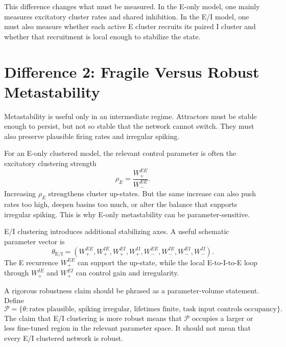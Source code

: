 This difference changes what must be measured. In the E-only model, one mainly measures excitatory cluster rates and shared inhibition. In the E/I model, one must also measure whether each active E cluster recruits its paired I cluster and whether that recruitment is local enough to stabilize the state.

\section{Difference 2: Fragile Versus Robust Metastability}
\label{sec:difference-fragile-versus-robust-metastability}

Metastability is useful only in an intermediate regime. Attractors must be stable enough to persist, but not so stable that the network cannot switch. They must also preserve plausible firing rates and irregular spiking.

For an E-only clustered model, the relevant control parameter is often the excitatory clustering strength
%
\begin{equation}
  \rho_E=\frac{W_+^{EE}}{W_-^{EE}}.
  \label{eq:e-cluster-strength-ratio-ch14}
\end{equation}
%
Increasing $\rho_E$ strengthens cluster up-states. But the same increase can also push rates too high, deepen basins too much, or alter the balance that supports irregular spiking. This is why E-only metastability can be parameter-sensitive.

E/I clustering introduces additional stabilizing axes. A useful schematic parameter vector is
%
\begin{equation}
  \theta_{\mathrm{E/I}}
  =
  (W_+^{EE},W_+^{IE},W_+^{EI},W_+^{II},
   W_-^{EE},W_-^{IE},W_-^{EI},W_-^{II}).
  \label{eq:ei-parameter-vector-ch14}
\end{equation}
%
The E recurrence $W_+^{EE}$ can support the up-state, while the local E-to-I-to-E loop through $W_+^{IE}$ and $W_+^{EI}$ can control gain and irregularity.

A rigorous robustness claim should be phrased as a parameter-volume statement. Define
%
\begin{equation}
  \mathcal{P}
  =
  \{\theta:
  \text{rates plausible, spiking irregular, lifetimes finite, task input controls occupancy}\}.
  \label{eq:robust-parameter-region}
\end{equation}
%
The claim that E/I clustering is more robust means that $\mathcal{P}$ occupies a larger or less fine-tuned region in the relevant parameter space. It should not mean that every E/I clustered network is robust.

